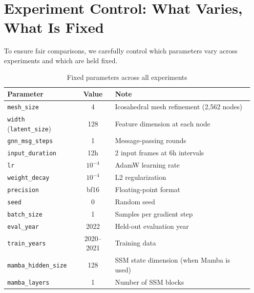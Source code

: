 \documentclass[11pt,a4paper]{article}
\begin{document}
\section{Experiment Control: What Varies, What Is Fixed}

To ensure fair comparisons, we carefully control which parameters vary across experiments and which are held fixed.

\begin{table}[H]
\centering
\caption{Fixed parameters across all experiments}
\begin{tabular}{lcp{6cm}}
\toprule
Parameter & Value & Note \\
\midrule
\texttt{mesh\_size} & 4 & Icosahedral mesh refinement (2,562 nodes) \\
\texttt{width} (\texttt{latent\_size}) & 128 & Feature dimension at each node \\
\texttt{gnn\_msg\_steps} & 1 & Message-passing rounds \\
\texttt{input\_duration} & 12h & 2 input frames at 6h intervals \\
\texttt{lr} & $10^{-4}$ & AdamW learning rate \\
\texttt{weight\_decay} & $10^{-4}$ & L2 regularization \\
\texttt{precision} & bf16 & Floating-point format \\
\texttt{seed} & 0 & Random seed \\
\texttt{batch\_size} & 1 & Samples per gradient step \\
\texttt{eval\_year} & 2022 & Held-out evaluation year \\
\texttt{train\_years} & 2020--2021 & Training data \\
\texttt{mamba\_hidden\_size} & 128 & SSM state dimension (when Mamba is used) \\
\texttt{mamba\_layers} & 1 & Number of SSM blocks \\
\bottomrule
\end{tabular}
\end{table}
\end{document}

